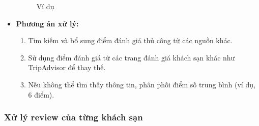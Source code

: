 \begin{itemize}
\begin{figure} [h]
        \caption{Ví dụ}
        \label{fig:image2.22}
    \end{figure}
    \item \textbf{Phương án xử lý:} 
    \begin{enumerate}
        \item Tìm kiếm và bổ sung điểm đánh giá thủ công từ các nguồn khác.
        \item Sử dụng điểm đánh giá từ các trang đánh giá khách sạn khác như TripAdvisor để thay thế.
        \item Nếu không thể tìm thấy thông tin, phân phối điểm số trung bình (ví dụ, 6 điểm).
    \end{enumerate}
\end{itemize}

\subsubsection{Xử lý review của từng khách sạn}

